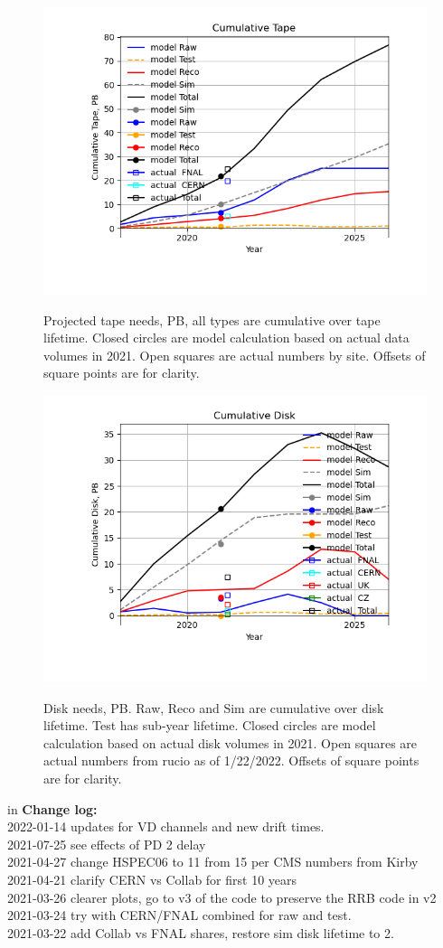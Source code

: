 \documentclass[12pt]{article}
\begin{document}
\begin{figure}
\centering\includegraphics[height=0.4\textwidth]{Cumulative-Tape.png}\label{CumulativeTape}
\caption{Projected  tape needs, PB, all types are cumulative over tape lifetime. Closed circles are model calculation based on actual data volumes in 2021. Open squares are actual numbers by site. Offsets of square points are for clarity.}
\end{figure}
\begin{figure}
\centering\includegraphics[height=0.4\textwidth]{Cumulative-Disk}\label{CumulativeDisk}
\caption{Disk needs, PB.  Raw, Reco and Sim are cumulative over disk lifetime.  Test has sub-year lifetime.  Closed circles are model calculation based on actual disk volumes in 2021. Open squares are actual numbers from rucio as of 1/22/2022. Offsets of square points are for clarity.}
\end{figure}
 in\pagebreak 
 {\bf Change log:}\\
2022-01-14 updates for VD channels and new drift times.\\2021-07-25 see effects of PD 2 delay\\2021-04-27 change HSPEC06 to 11 from 15 per CMS numbers from Kirby\\2021-04-21 clarify CERN vs Collab for first 10 years\\2021-03-26 clearer plots, go to v3 of the code to preserve the RRB code in v2\\2021-03-24 try with CERN/FNAL combined for raw and test.\\2021-03-22 add Collab vs FNAL shares, restore sim disk lifetime to 2.\\
\end{document}
